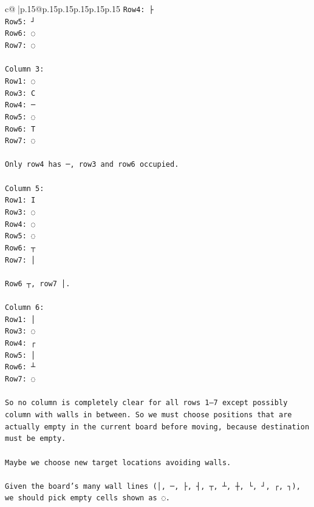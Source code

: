 \documentclass{article}
\begin{document}
{\begin{supertabular}{c@{$\;$}|p{.15\linewidth}@{}p{.15\linewidth}p{.15\linewidth}p{.15\linewidth}p{.15\linewidth}p{.15\linewidth}}
{{{\texttt{Row4: ├  } \\
\texttt{Row5: ┘  } \\
\texttt{Row6: ◌  } \\
\texttt{Row7: ◌  } \\
\\ 
\texttt{Column 3:  } \\
\texttt{Row1: ◌  } \\
\texttt{Row3: C  } \\
\texttt{Row4: ─  } \\
\texttt{Row5: ◌  } \\
\texttt{Row6: T  } \\
\texttt{Row7: ◌  } \\
\\ 
\texttt{Only row4 has ─, row3 and row6 occupied.} \\
\\ 
\texttt{Column 5:  } \\
\texttt{Row1: I  } \\
\texttt{Row3: ◌  } \\
\texttt{Row4: ◌  } \\
\texttt{Row5: ◌  } \\
\texttt{Row6: ┬  } \\
\texttt{Row7: │  } \\
\\ 
\texttt{Row6 ┬, row7 │.} \\
\\ 
\texttt{Column 6:  } \\
\texttt{Row1: │  } \\
\texttt{Row3: ◌  } \\
\texttt{Row4: ┌  } \\
\texttt{Row5: │  } \\
\texttt{Row6: ┴  } \\
\texttt{Row7: ◌  } \\
\\ 
\texttt{So no column is completely clear for all rows 1–7 except possibly column with walls in between. So we must choose positions that are actually empty in the current board before moving, because destination must be empty.} \\
\\ 
\texttt{Maybe we choose new target locations avoiding walls.} \\
\\ 
\texttt{Given the board's many wall lines (│, ─, ├, ┤, ┬, ┴, ┼, └, ┘, ┌, ┐), we should pick empty cells shown as ◌.} \\
}}}
\end{supertabular}}
\end{document}
